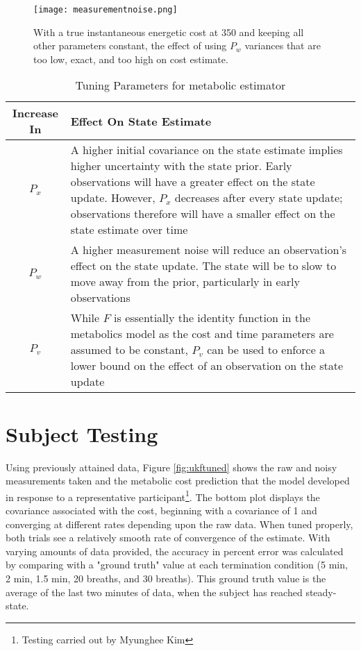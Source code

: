 \begin{figure}[t]
\centering
\texttt{[image: measurementnoise.png]}
\caption{With a true instantaneous energetic cost at 350 and keeping all other parameters constant, the effect of using $P_w$ variances that are too low, exact, and too high on cost estimate.}
\label{fig:measurementnoise}
\end{figure}

\begin{table}
  \centering
  \begin{tabular}{ | c | p{10cm} |}
  \hline
  Increase In & Effect On State Estimate \\ \hline

  $P_x$ & A higher initial covariance on the state estimate implies higher uncertainty with the state prior. Early observations will have a greater effect on the state update. However, $P_x$ decreases after every state update; observations therefore will have a smaller effect on the state estimate over time\\ \hline

  $P_w$ & A higher measurement noise will reduce an observation's effect on the state update. The state will be to slow to move away from the prior, particularly in early observations\\ \hline

  $P_v$ & While $F$ is essentially the identity function in the metabolics model as the cost and time parameters are assumed to be constant, $P_v$ can be used to enforce a lower bound on the effect of an observation on the state update\\ \hline

  \end{tabular}
  \caption{Tuning Parameters for metabolic estimator}
  \label{tab:esttuningparams}
\end{table}

\section{Subject Testing}
Using previously attained data, Figure \ref{fig:ukftuned} shows the raw and noisy measurements taken and the metabolic cost prediction that the model developed in response to a representative participant\footnote{Testing carried out by Myunghee Kim}. The bottom plot displays the covariance associated with the cost, beginning with a covariance of 1 and converging at different rates depending upon the raw data. When tuned properly, both trials see a relatively smooth rate of convergence of the estimate. With varying amounts of data provided, the accuracy in percent error was calculated by comparing with a "ground truth" value at each termination condition (5 min, 2 min, 1.5 min, 20 breaths, and 30 breaths). This ground truth value is the average of the last two minutes of data, when the subject has reached steady-state.

